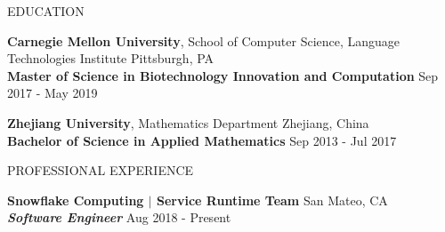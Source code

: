 \documentclass{res}
\begin{document}
\address{yuchenc1@cs.cmu.edu $\cdot$ 412-478-9381 $\cdot$ https://www.linkedin.com/in/yuchen-cao-cmu $\cdot$ https://github.com/yuchenc1}

\begin{resume}

\vspace{-1.0em}

\begin{section}{EDUCATION}
\vspace{1.5em}
\fullline
\vspace{-0.5em}

\textbf{Carnegie Mellon University}, School of Computer Science, Language Technologies Institute \hfill {Pittsburgh, PA}\\
\textbf{Master of Science in Biotechnology Innovation and Computation} \hfill {Sep 2017 - May 2019} 

\vspace{-0.7em}

\textbf{Zhejiang University}, Mathematics Department \hfill {Zhejiang, China} \\
\textbf{Bachelor of Science in Applied Mathematics} \hfill {Sep 2013 - Jul 2017} 

\end{section}

\vspace{-0.5em}
 
\begin{section}{PROFESSIONAL EXPERIENCE}
\vspace{1.5em}
\fullline
\vspace{-0.5em}

\textbf{Snowflake Computing $\mid$ Service Runtime Team} \hfill {San Mateo, CA}\\
\textit{\textbf{Software Engineer}} \hfill {Aug 2018 - Present}
\vspace{-0.6em}


\end{section}
\end{resume}
\end{document}
